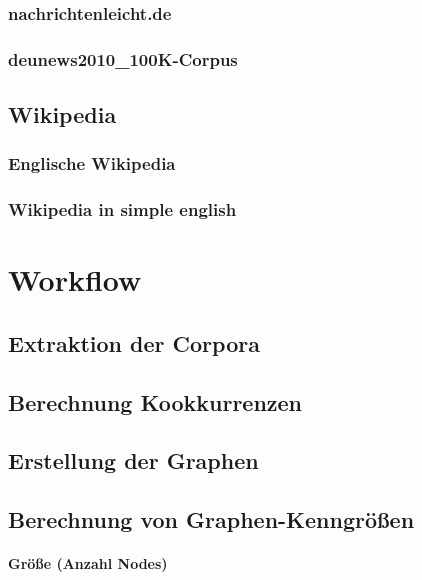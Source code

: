 \documentclass[12pt]{article}
\begin{document}
\subsubsection{nachrichtenleicht.de}

\subsubsection{deunews2010\_100K-Corpus}


\subsection{Wikipedia}

\subsubsection{Englische Wikipedia}

\subsubsection{Wikipedia in simple english}



\section{Workflow}

\subsection{Extraktion der Corpora}


\subsection{Berechnung Kookkurrenzen}


\subsection{Erstellung der Graphen}


\subsection{Berechnung von Graphen-Kenngr\"o\ss{}en}


\paragraph{Gr\"o\ss{}e (Anzahl Nodes)}
\end{document}
